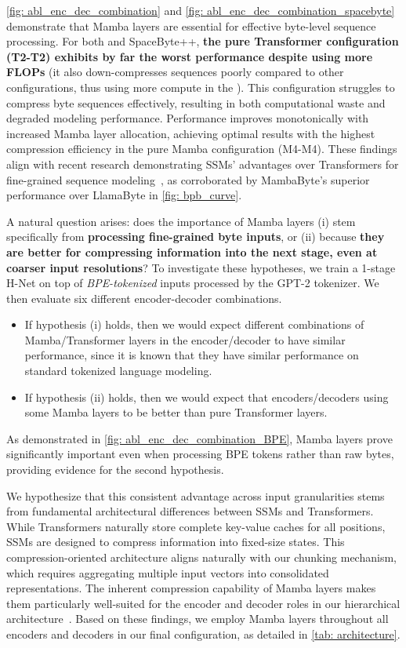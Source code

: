 \cref{fig: abl_enc_dec_combination} and \cref{fig: abl_enc_dec_combination_spacebyte} demonstrate that Mamba layers are essential for effective byte-level sequence processing.
For both \model{} and SpaceByte++, \textbf{the pure Transformer configuration (T2-T2) exhibits by far the worst performance despite using more FLOPs} (it also down-compresses sequences poorly compared to other configurations, thus using more compute in the \main{}).
This configuration struggles to compress byte sequences effectively, resulting in both computational waste and degraded modeling performance.
Performance improves monotonically with increased Mamba layer allocation, achieving optimal results with the highest compression efficiency in the pure Mamba configuration (M4-M4).
These findings align with recent research demonstrating SSMs' advantages over Transformers for fine-grained sequence modeling~\citep{SaShiMi, Caduceus}, as corroborated by MambaByte's superior performance over LlamaByte in \cref{fig: bpb_curve}.


A natural question arises: does the importance of Mamba layers (i) stem specifically from \textbf{processing fine-grained byte inputs},
or (ii) because \textbf{they are better for compressing information into the next stage, even at coarser input resolutions}?
To investigate these hypotheses,
we train a 1-stage H-Net on top of \emph{BPE-tokenized} inputs processed by the GPT-2 tokenizer.
We then evaluate six different encoder-decoder combinations. 
\begin{itemize}
    \item If hypothesis (i) holds, then we would expect different combinations of Mamba/Transformer layers in the encoder/decoder to have similar performance, since it is known that they have similar performance on standard tokenized language modeling.
    \item If hypothesis (ii) holds, then we would expect that encoders/decoders using some Mamba layers to be better than pure Transformer layers.
\end{itemize}

As demonstrated in \cref{fig: abl_enc_dec_combination_BPE}, Mamba layers prove significantly important even when processing BPE tokens rather than raw bytes, providing evidence for the second hypothesis.

We hypothesize that this consistent advantage across input granularities stems from fundamental architectural differences between SSMs and Transformers.
While Transformers naturally store complete key-value caches for all positions, SSMs are designed to compress information into fixed-size states.
This compression-oriented architecture aligns naturally with our chunking mechanism, which requires aggregating multiple input vectors into consolidated representations.
The inherent compression capability of Mamba layers makes them particularly well-suited for the encoder and decoder roles in our hierarchical architecture~\citep{gu2025tradeoffs}.
Based on these findings, we employ Mamba layers throughout all encoders and decoders in our final \model{} configuration, as detailed in \cref{tab: architecture}.

